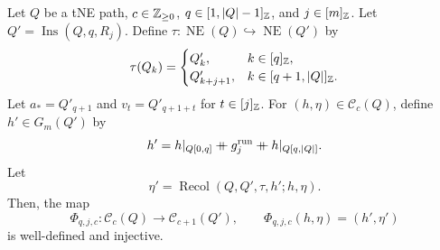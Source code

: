 \begin{lemma}\label{lem:simple-run-insertion}
Let $Q$ be a tNE path, $c\in\mathbb Z_{\ge0}$, $q\in[1,|Q|-1]_{\mathbb Z}$, and $j\in[m]_{\mathbb Z}$.
Let $Q'=\operatorname{Ins}(Q,q,R_j)$.
Define $\tau\colon\operatorname{NE}(Q)\hookrightarrow\operatorname{NE}(Q')$ by
\begin{equation}\label{eq:run-insertion-map}
 \tau(Q_k)=
 \begin{cases}
 Q'_k,&k\in[q]_{\mathbb Z},\\
 Q'_{k+j+1},&k\in[q+1,|Q|]_{\mathbb Z}.
 \end{cases}
\end{equation}
Let $a_*=Q'_{q+1}$ and $v_t=Q'_{q+1+t}$ for $t\in[j]_{\mathbb Z}$.
For $(h,\eta)\in\mathcal C_c(Q)$, define $h'\in G_m(Q')$ by
\begin{equation}\label{eq:run-insertion-grades}
 h'=h|_{Q[0,q]}\mathbin{+\mkern-10mu+} g_j^{\mathrm{run}}\mathbin{+\mkern-10mu+} h|_{Q[q,|Q|]}.
\end{equation}
Let
\begin{equation}\label{eq:run-insertion-recolor}
 \eta'=\operatorname{Recol}(Q,Q',\tau,h';h,\eta).
\end{equation}
Then, the map
\[
 \Phi_{q,j,c}\colon\mathcal C_c(Q)\longrightarrow\mathcal C_{c+1}(Q'),
 \qquad \Phi_{q,j,c}(h,\eta)=(h',\eta')
\]
is well-defined and injective.
\end{lemma}
